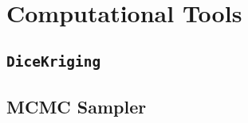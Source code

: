\chapter{Computational Tools}\label{app:computational_tools}

\section{\texttt{DiceKriging}}\label{sec:dice_kriging}

\section{MCMC Sampler}\label{sec:mcmc_sampler}

